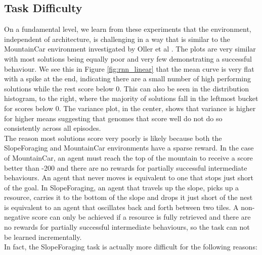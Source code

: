 \documentclass[12pt]{article}
\begin{document}
\subsection{Task Difficulty} \label{task_difficulty}

On a fundamental level, we learn from these experiments that the environment, independent of architecture, is challenging in a way that is similar to the MountainCar environment  \cite{MountainCar} investigated by Oller et al \cite{oller:AAMAS:2020}. 
The plots are very similar with most solutions being equally poor and very few demonstrating a successful behaviour. 
We see this in Figure \ref{fig:rnn_linear} that the mean curve is very flat with a spike at the end, indicating there are a small number of high performing solutions while the rest score below 0.
This can also be seen in the distribution histogram, to the right, where the majority of solutions fall in the leftmost bucket for scores below 0. 
The variance plot, in the center, shows that variance is higher for higher means suggesting that genomes that score well do not do so consistently across all episodes.\\

The reason most solutions score very poorly is likely because both the SlopeForaging and MountainCar environments have a sparse reward. 
In the case of MountainCar, an agent must reach the top of the mountain to receive a score better than -200 and there are no rewards for partially successful intermediate behaviours. 
An agent that never moves is equivalent to one that stops just short of the goal. 
In SlopeForaging, an agent that travels up the slope, picks up a resource, carries it to the bottom of the slope and drops it just short of the nest is equivalent to an agent that oscillates back and forth between two tiles. 
A non-negative score can only be achieved if a resource is fully retrieved and there are no rewards for partially successful intermediate behaviours, so the task can not be learned incrementally.\\

In fact, the SlopeForaging task is actually more difficult for the following reasons:
\end{document}
